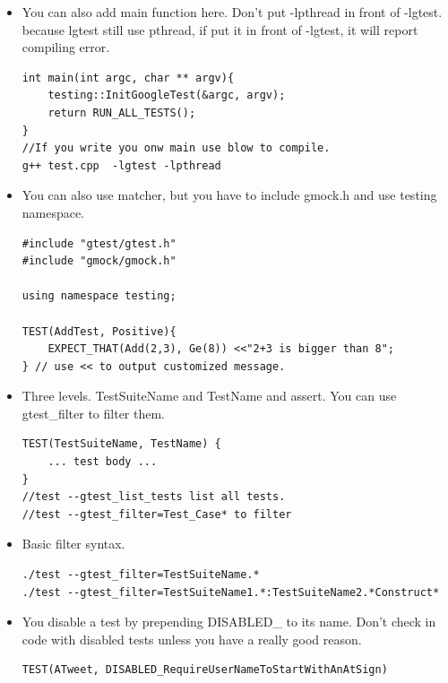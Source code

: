 \documentclass[a4paper,11pt,twoside]{book}
\begin{document}
\begin{itemize}
\item You can also add main function here. Don't put -lpthread in front of -lgtest. because lgtest still use pthread, if put it in front of -lgtest, it will report compiling error.
\begin{lstlisting}
int main(int argc, char ** argv){
	testing::InitGoogleTest(&argc, argv);
	return RUN_ALL_TESTS();
}
//If you write you onw main use blow to compile. 
g++ test.cpp  -lgtest -lpthread
\end{lstlisting}

\item You can also use matcher, but you have to include gmock.h and use testing namespace.
\begin{lstlisting}
#include "gtest/gtest.h"
#include "gmock/gmock.h"

using namespace testing;

TEST(AddTest, Positive){
	EXPECT_THAT(Add(2,3), Ge(8)) <<"2+3 is bigger than 8";
} // use << to output customized message. 
\end{lstlisting}

\item Three levels. TestSuiteName and TestName and assert. You can use gtest\_filter to filter them.

\begin{lstlisting}
TEST(TestSuiteName, TestName) {
	... test body ...
}
//test --gtest_list_tests list all tests.
//test --gtest_filter=Test_Case* to filter 
\end{lstlisting}

\item Basic filter syntax. 
\begin{lstlisting}
./test --gtest_filter=TestSuiteName.*
./test --gtest_filter=TestSuiteName1.*:TestSuiteName2.*Construct*
\end{lstlisting}

\item  You disable a test by prepending DISABLED\_ to its name.  Don't check in code with disabled tests unless you have a really good reason.
\begin{lstlisting}
TEST(ATweet, DISABLED_RequireUserNameToStartWithAnAtSign)
\end{lstlisting}


\end{itemize}
\end{document}
